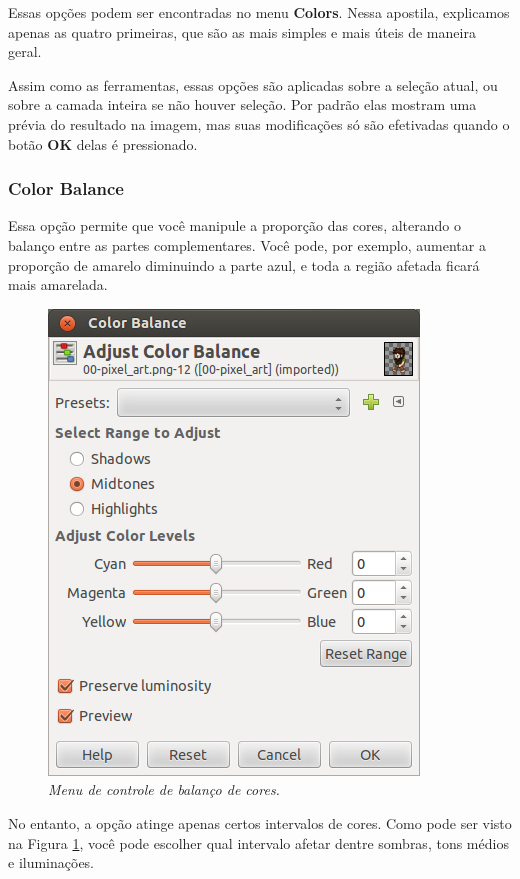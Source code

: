 \documentclass[12pt,onecolumn]{article}
\begin{document}
    Essas opções podem ser encontradas no menu {\bf Colors}. Nessa apostila,
    explicamos apenas as quatro primeiras, que são as mais simples e mais úteis
    de maneira geral.
    
    Assim como as ferramentas, essas opções são aplicadas sobre a seleção atual,
    ou sobre a camada inteira se não houver seleção. Por padrão elas mostram uma
    prévia do resultado na imagem, mas suas modificações só são efetivadas quando
    o botão \textbf{OK} delas é pressionado.
    
      \subsubsection{Color Balance}
        Essa opção permite que você manipule a proporção das cores, alterando o
        balanço entre as partes complementares. Você pode, por exemplo, aumentar
        a proporção de amarelo diminuindo a parte azul, e toda a região afetada
        ficará mais amarelada.
      
        \begin{figure}[H]
          \centering
          \includegraphics[width=.6\linewidth]{screenshots/08-color_balance.png}
          \caption{
            \footnotesize
            \it
            Menu de controle de balanço de cores.
          }
          \label{fig:color_balance}
        \end{figure}
        
        No entanto, a opção atinge apenas certos intervalos de cores. Como pode
        ser visto na Figura \ref{fig:color_balance}, você pode escolher qual
        intervalo afetar dentre sombras, tons médios e iluminações.
        
\end{document}
